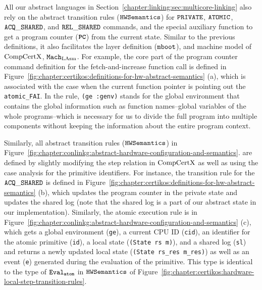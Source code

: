 All our abstract languages in Section~\ref{chapter:linking:sec:multicore-linking} 
also rely on the abstract transition rules (${\mathrm{\texttt{HWSemantics}}}$) for 
${{\mathrm{\texttt{PRIVATE}}}}$, ${{\mathrm{\texttt{ATOMIC}}}}$, ${{\mathrm{\texttt{ACQ}}}\_{\mathrm{\texttt{SHARED}}}}$, and ${{\mathrm{\texttt{REL}}}\_{\mathrm{\texttt{SHARED}}}}$ commands, and the special auxiliary function to get a program counter (${{\mathrm{\texttt{\textbf{PC}}}}}$) from the current state.
Similar to the previous definitions, 
it also facilitates the layer definition (${\mathrm{\texttt{mboot}}}$), 
and machine model of $\mathrm{CompCertX}$, ${\mathrm{\texttt{Mach}}}_{\mathrm{LAsm}}$.
For example, the core part of the program counter command definition for the fetch-and-increase function call is defined in Figure~\ref{fig:chapter:certikos:definitions-for-hw-abstract-semantics} (a), which is associated with the case when the current function pointer is pointing out the \lstinline$atomic_FAI$. 
In the rule, \lstinline$(ge :genv)$ stands for the global environment that contains the 
global information such as function names--global variables of the whole programs--which 
is necessary for us to divide the full program into multiple components without keeping the information 
about the entire program context.


Similarly, all abstract transition rules   (${\mathrm{\texttt{HWSemantics}}}$)  in  Figure~\ref{fig:chapter:conlinkg:abstract-hardware-configuration-and-semantics}.
are defined 
by slightly modifying the step relation in $\mathrm{CompCertX}$ as well as using the case analysis for the primitive identifiers. 
For instance, the transition rule for the ${{\mathrm{\texttt{ACQ}}}\_{\mathrm{\texttt{SHARED}}}}$ is defined in Figure~\ref{fig:chapter:certikos:definitions-for-hw-abstract-semantics} (b), which updates the program counter in the private state
and updates the shared log (note that the shared log is a part of our abstract state in our implementation).
Similarly, the atomic execution rule is in Figure~\ref{fig:chapter:conlinkg:abstract-hardware-configuration-and-semantics} (c),
which gets a global environment (\lstinline$ge$), a current CPU ID (\lstinline$cid$),  an identifier for the atomic primitive
(\lstinline$id$),  a local state (\lstinline$(State rs m)$),
and a shared log (\lstinline$sl$) and returns a newly updated local state (\lstinline$(State rs_res m_res)$) as well as an event (\lstinline$e$) generated during the evaluation of the primitive.
This type is identical to the type of ${{\mathrm{\texttt{Eval}}}_{{\mathrm{\texttt{atom}}}}}$ in ${\mathrm{\texttt{HWSemantics}}}$ of Figure~\ref{fig:chapter:certikos:hardware-local-step-transition-rules}.

